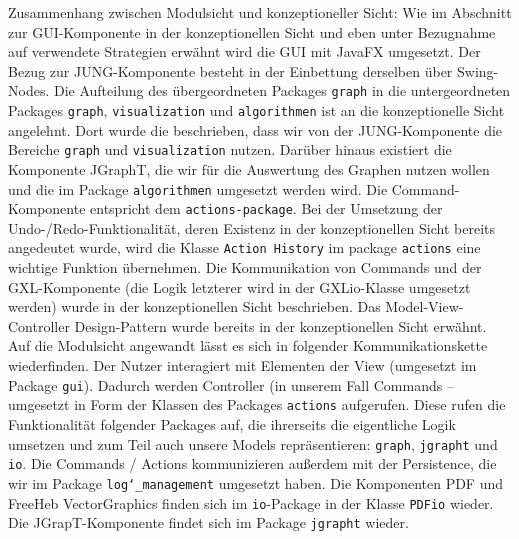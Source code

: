 \documentclass[enabledeprecatedfontcommands,fontsize=11pt,paper=a4,twoside]{scrartcl}
\newcounter{one}
\begin{document}
Zusammenhang zwischen Modulsicht und konzeptioneller Sicht: Wie im Abschnitt zur GUI-Komponente  in der konzeptionellen Sicht und eben unter Bezugnahme auf verwendete Strategien erwähnt wird die GUI mit JavaFX umgesetzt. Der Bezug zur JUNG-Komponente besteht in der Einbettung derselben über Swing-Nodes. Die Aufteilung des übergeordneten Packages \texttt{graph} in die untergeordneten Packages \texttt{graph}, \texttt{visualization} und \texttt{algorithmen} ist an die konzeptionelle Sicht angelehnt. Dort wurde die beschrieben, dass wir von der JUNG-Komponente die Bereiche \texttt{graph} und \texttt{visualization}  nutzen. Darüber hinaus existiert die Komponente JGraphT, die wir für die Auswertung des Graphen nutzen wollen und die im Package \texttt{algorithmen} umgesetzt werden wird. Die Command-Komponente entspricht dem \texttt{actions-package}. Bei der Umsetzung der Undo-/Redo-Funktionalität, deren Existenz in der konzeptionellen Sicht bereits angedeutet wurde, wird die Klasse \texttt{Action History} im package \texttt{actions} eine wichtige Funktion übernehmen. Die Kommunikation von Commands und der GXL-Komponente (die Logik letzterer wird in der GXLio-Klasse umgesetzt werden) wurde in der konzeptionellen Sicht beschrieben. Das Model-View-Controller Design-Pattern wurde bereits in der konzeptionellen Sicht erwähnt. Auf die Modulsicht angewandt lässt es sich in folgender Kommunikationskette wiederfinden. Der Nutzer interagiert mit Elementen der View (umgesetzt im Package \texttt{gui}). Dadurch werden Controller (in unserem Fall Commands – umgesetzt in Form der Klassen des Packages \texttt{actions} aufgerufen. Diese rufen die Funktionalität folgender Packages auf, die ihrerseits die eigentliche Logik umsetzen und zum Teil auch unsere Models repräsentieren: \texttt{graph}, \texttt{jgrapht} und \texttt{io}. Die Commands / Actions kommunizieren außerdem mit der Persistence, die wir im Package \texttt{log\char`_management} umgesetzt haben. Die Komponenten PDF und FreeHeb VectorGraphics finden sich im \texttt{io}-Package in der Klasse \texttt{PDFio} wieder. Die JGrapT-Komponente findet sich im Package \texttt{jgrapht}  wieder.
\newpage











\newpage
\end{document}
